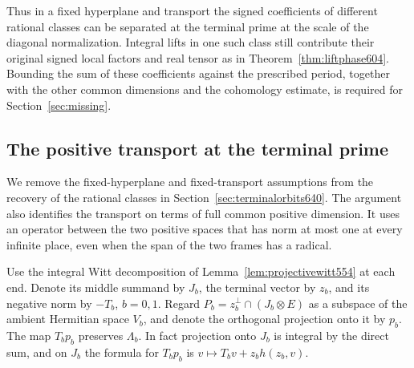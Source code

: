 \documentclass[a4paper,11pt]{article}
\theoremstyle{definition}
\theoremstyle{remark}
\numberwithin{equation}{section}
\begin{document}
Thus in a fixed hyperplane and transport the signed coefficients
of different rational classes can be separated at the terminal
prime at the scale of the diagonal normalization. Integral
lifts in one such class still contribute their original signed
local factors and real tensor as in
Theorem~\ref{thm:liftphase604}. Bounding the sum of these
coefficients against the prescribed period, together with the
other common dimensions and the cohomology estimate, is required
for Section~\ref{sec:missing}.


\subsection{The positive transport at the terminal prime}
\label{sec:terminaltransport641}

We remove the fixed-hyperplane and fixed-transport assumptions
from the recovery of the rational classes in
Section~\ref{sec:terminalorbits640}. The argument also identifies
the transport on terms of full common positive dimension. It uses
an operator between the two positive spaces that has norm at most
one at every infinite place, even when the span of the two frames
has a radical.

Use the integral Witt decomposition of Lemma~\ref{lem:projectivewitt554}
at each end. Denote its middle summand by \(J_b\), the terminal
vector by \(z_b\), and its negative norm by \(-T_b\), \(b=0,1\).
Regard \(P_b=z_b^\perp\cap (J_b\otimes E)\) as a subspace of
the ambient Hermitian space \(V_b\), and denote the orthogonal
projection onto it by \(p_b\). The map \(T_bp_b\) preserves
\(\Lambda_b\). In fact projection onto \(J_b\) is integral by
the direct sum, and on \(J_b\) the formula for \(T_bp_b\) is
\(v\mapsto T_bv+z_bh(z_b,v)\).
\end{document}
